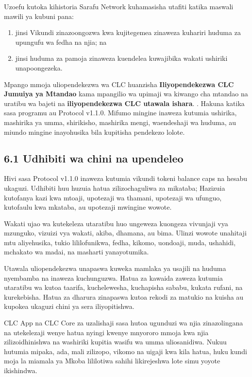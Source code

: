 \documentclass[11pt]{article}
\begin{document}
Uzoefu kutoka kihistoria Sarafu Network kuhamasisha utafiti katika maswali mawili ya kubuni pana:

\begin{enumerate}[leftmargin=*]
\item jinsi Vikundi zinazoongozwa kwa kujitegemea zinaweza kuhariri huduma za upungufu wa fedha na njia; na
\item jinsi huduma za pamoja zinaweza kuendelea kuwajibika wakati ushiriki unapoongezeka.
\end{enumerate}
Mpango mmoja uliopendekezwa wa CLC huanzisha \textbf{Iliyopendekezwa CLC Jumuiya ya Mtandao } kama mpangilio wa upimaji wa kiwango cha mtandao na uratibu wa bajeti na \textbf{ iliyopendekezwa CLC utawala ishara}. . Hakuna katika sasa programu au Protocol v1.1.0. Mifumo mingine inaweza kutumia ushirika, mashirika ya umma, shirikisho, mashirika mengi, waendeshaji wa huduma, au miundo mingine inayohusika bila kupitisha pendekezo lolote.

\subsection*{6.1 Udhibiti wa chini na upendeleo}

Hivi sasa Protocol v1.1.0 inaweza kutumia vikundi tokeni balance caps na hesabu ukaguzi. Udhibiti huu huzuia hatua zilizochaguliwa za mikataba; Hazizuia kutofanya kazi kwa mtoaji, upotezaji wa thamani, upotezaji wa ufunguo, kutofaulu kwa mkataba, au upotezaji mwingine wowote.

Wakati ujao wa kutekeleza utaratibu huo ungeweza kuongeza vivunjaji vya mzunguko, vizuizi vya wakati, akiba, dhamana, au bima. Ulinzi wowote unahitaji mtu aliyehusika, tukio lililofunikwa, fedha, kikomo, uondoaji, muda, ushahidi, mchakato wa madai, na masharti yanayotumika.

Utawala uliopendekezwa unapaswa kuweka mamlaka ya usajili na huduma nyembamba na inaweza kuchunguzwa. Hatua za kawaida zaweza kutumia utaratibu wa kutoa taarifa, kuchelewesha, kuchapisha sababu, kukata rufani, na kurekebisha. Hatua za dharura zinapaswa kutoa rekodi za matukio na kuisha au kupokea ukaguzi chini ya sera iliyopitishwa.

CLC App na CLC Core za uzalishaji sasa hutoa ugunduzi wa njia zinazolingana na utekelezaji wenye hatua nyingi kwenye mnyororo mmoja kwa njia zilizoidhinishwa na washiriki kupitia wasifu wa umma uliosanidiwa. Nukuu hutumia mipaka, ada, mali zilizopo, vikomo na uigaji kwa kila hatua, huku kundi moja la miamala ya Mkoba lililotiwa sahihi likirejeshwa lote simu yoyote ikishindwa.
\end{document}
